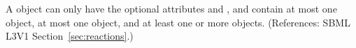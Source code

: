 A \ListOfLocalParameters object can only have the optional attributes
 and , and contain at most one \Notes object,
at most one \Annotation object, and at least one or more \LocalParameter
objects.  (References: SBML L3V1 Section~\ref{sec:reactions}.)
